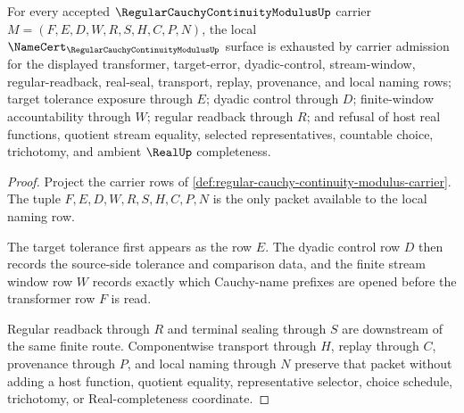 \begin{theorem}
\label{thm:regular-cauchy-continuity-modulus-namecert-obligations}
For every accepted $\RegularCauchyContinuityModulusUp$ carrier $M=(F,E,D,W,R,S,H,C,P,N)$, the local $\NameCert_{\RegularCauchyContinuityModulusUp}$ surface is exhausted by carrier admission for the displayed transformer, target-error, dyadic-control, stream-window, regular-readback, real-seal, transport, replay, provenance, and local naming rows; target tolerance exposure through $E$; dyadic control through $D$; finite-window accountability through $W$; regular readback through $R$; and refusal of host real functions, quotient stream equality, selected representatives, countable choice, trichotomy, and ambient $\RealUp$ completeness.
\end{theorem}
\begin{proof}
Project the carrier rows of \autoref{def:regular-cauchy-continuity-modulus-carrier}. The tuple $F,E,D,W,R,S,H,C,P,N$ is the only packet available to the local naming row.

The target tolerance first appears as the row $E$. The dyadic control row $D$ then records the source-side tolerance and comparison data, and the finite stream window row $W$ records exactly which Cauchy-name prefixes are opened before the transformer row $F$ is read.

Regular readback through $R$ and terminal sealing through $S$ are downstream of the same finite route. Componentwise transport through $H$, replay through $C$, provenance through $P$, and local naming through $N$ preserve that packet without adding a host function, quotient equality, representative selector, choice schedule, trichotomy, or Real-completeness coordinate.
\end{proof}

